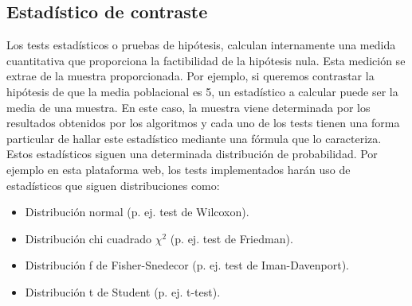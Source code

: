
\subsection{Estadístico de contraste}
Los tests estadísticos o pruebas de hipótesis, calculan internamente una medida cuantitativa que proporciona la
factibilidad de la hipótesis nula. Esta medición se extrae de la muestra proporcionada. Por ejemplo, si queremos
contrastar la hipótesis de que la media poblacional es 5, un estadístico a calcular puede ser la media de una
muestra. En este caso, la muestra viene determinada por los resultados obtenidos por los algoritmos y cada uno de
los tests tienen una forma particular de hallar este estadístico mediante una fórmula que lo caracteriza. Estos
estadísticos siguen una determinada distribución de probabilidad. Por ejemplo en esta plataforma web, los tests
implementados harán uso de estadísticos que siguen distribuciones como:
\begin{itemize}
\item Distribución normal (p. ej. test de Wilcoxon).
\item Distribución chi cuadrado $\chi^2$ (p. ej. test de Friedman).
\item Distribución f de Fisher-Snedecor (p. ej. test de Iman-Davenport).
\item Distribución t de Student (p. ej. t-test).
\end{itemize}
\begin{figure}[h]
\centering
{}
\end{figure}

